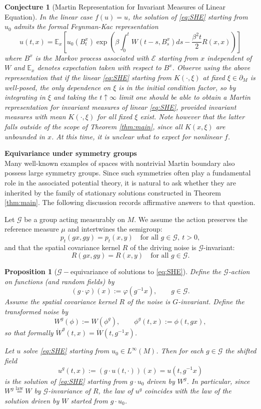 \documentclass{article}
\newtheorem{conjecture}[theorem]{Conjecture}
\newtheorem{proposition}[theorem]{Proposition}
\numberwithin{theorem}{section}
\def\text{\mbox}
\def\EE{\mathbb{E}} %
\def\mc{\mathcal}
\begin{document}
\begin{conjecture}[Martin Representation for Invariant Measures of Linear Equation]
    In the linear case $f(u)=u$, the solution of \eqref{eq:SHE} starting from $u_0$ admits the formal Feynman-Kac representation \[u(t,x)=\EE_x\left[u_0(B^x_t)\exp\left(\beta\int_0^tW(t-s,B^x_s)ds-\frac{\beta^2t}{2}R(x,x)\right)\right]\] where $B^x$ is the Markov process associated with $\mathcal{E}$ starting from $x$ independent of $W$ and $\EE_x$ denotes expectation taken with respect to $B^x$.
    Observe using the above representation that if the linear \eqref{eq:SHE} starting from $K(\cdot,\xi)$ at fixed $\xi\in \partial_M$ is well-posed, the only dependence on $\xi$ is in the initial condition factor, so by integrating in $\xi$ and taking the $t\uparrow\infty$ limit one should be able to obtain a Martin representation for invariant measures of linear \eqref{eq:SHE}, provided invariant measures with mean $K(\cdot,\xi)$ for all fixed $\xi$ exist. Note however that the latter falls outside of the scope of Theorem \ref{thm:main}, since all $K(x,\xi)$ are unbounded in $x$. At this time, it is unclear what to expect for nonlinear $f$.
\end{conjecture}


\noindent\textbf{Equivariance under symmetry groups}\\
Many well-known examples of spaces with nontrivial Martin boundary also possess large symmetry groups. Since such symmetries often play a fundamental role in the associated potential theory, it is natural to ask whether they are inherited by the family of stationary solutions constructed in Theorem \ref{thm:main}. The following discussion records affirmative answers to that question.

Let $\mathcal G$ be a group acting measurably on $M$. We assume the action preserves the reference measure $\mu$ and intertwines the semigroup:
\[
p_t(gx,gy)=p_t(x,y)
\quad\text{for all }g\in\mathcal G,\ t>0,
\]
and that the spatial covariance kernel $R$ of the driving noise is $\mathcal G$-invariant:
\[
R(gx,gy)=R(x,y)
\quad\text{for all }g\in\mathcal G.
\]

\begin{proposition}[\(\mc{G}-\)equivariance of solutions to \eqref{eq:SHE}]
\label{prop:isom-equiv-mild}
Define the $\mathcal{G}$-action on functions (and random fields) by
\[
(g\cdot \varphi)(x):=\varphi(g^{-1}x),\qquad g\in \mc{G}.
\]
Assume the spatial covariance kernel $R$ of the noise is $G$-invariant.
Define the transformed noise by
\[
W^g(\phi):=W(\phi^g),\qquad \phi^g(t,x):=\phi(t,gx),
\]
so that formally $\dot W^g(t,x)=\dot W(t,g^{-1}x)$.

Let $u$ solve \eqref{eq:SHE} starting from $u_0\in L^\infty(M)$.
Then for each $g\in \mathcal{G}$ the shifted field
\[
u^g(t,x):=(g\cdot u(t,\cdot))(x)=u(t,g^{-1}x)
\]
is the solution of \eqref{eq:SHE} starting from $g\cdot u_0$ driven by $W^g$. In particular, since $W^g\stackrel{\mathrm{law}}{=}W$ by $\mc{G}$-invariance of $R$, the law of $u^g$ coincides with the law of the solution driven by $W$ started from $g\cdot u_0$.
\end{proposition}
\end{document}
